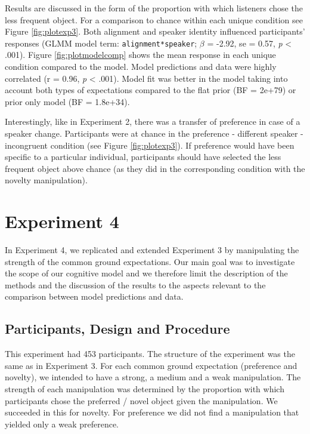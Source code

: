 \documentclass[10pt, letterpaper]{article}
\begin{document}
Results are discussed in the form of the proportion with which listeners
chose the less frequent object. For a comparison to chance within each
unique condition see Figure \ref{fig:plotexp3}. Both alignment and
speaker identity influenced participants' responses (GLMM model term:
\texttt{alignment*speaker}; \(\beta\) = -2.92, se = 0.57, \emph{p}
\textless{} .001). Figure \ref{fig:plotmodelcomp} shows the mean
response in each unique condition compared to the model. Model
predictions and data were highly correlated (r = 0.96, \emph{p}
\textless{} .001). Model fit was better in the model taking into account
both types of expectations compared to the flat prior (BF = 2e+79) or
prior only model (BF = 1.8e+34).

Interestingly, like in Experiment 2, there was a transfer of preference
in case of a speaker change. Participants were at chance in the
preference - different speaker - incongruent condition (see Figure
\ref{fig:plotexp3}). If preference would have been specific to a
particular individual, participants should have selected the less
frequent object above chance (as they did in the corresponding condition
with the novelty manipulation).

\section{Experiment 4}\label{experiment-4}

In Experiment 4, we replicated and extended Experiment 3 by manipulating
the strength of the common ground expectations. Our main goal was to
investigate the scope of our cognitive model and we therefore limit the
description of the methods and the discussion of the results to the
aspects relevant to the comparison between model predictions and data.

\subsection{Participants, Design and
Procedure}\label{participants-design-and-procedure-3}

This experiment had 453 participants. The structure of the experiment
was the same as in Experiment 3. For each common ground expectation
(preference and novelty), we intended to have a strong, a medium and a
weak manipulation. The strength of each manipulation was determined by
the proportion with which participants chose the preferred / novel
object given the manipulation. We succeeded in this for novelty. For
preference we did not find a manipulation that yielded only a weak
preference.
\end{document}
